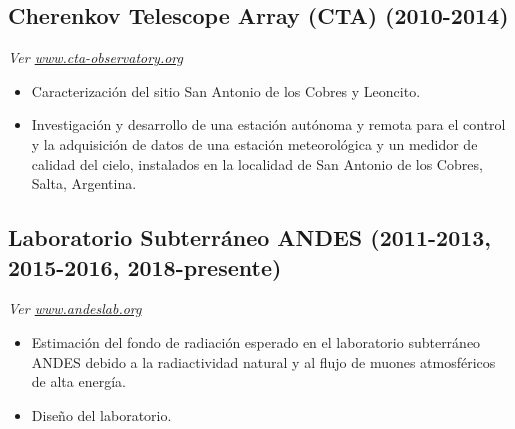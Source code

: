 \subsection*{Cherenkov Telescope Array (CTA) (2010-2014)}
{\small{\textit{Ver \href{http://www.cta-observatory.org}{www.cta-observatory.org}}}}
\begin{itemize}
\item Caracterización del sitio San Antonio de los Cobres y Leoncito. %
\item Investigación y desarrollo de una estación autónoma y remota para el control y la adquisición de datos de una estación meteorológica y un medidor de calidad del cielo, instalados en la localidad de San Antonio de los Cobres, Salta, Argentina.
\end{itemize}
 
\subsection*{Laboratorio Subterráneo ANDES (2011-2013, 2015-2016, 2018-presente)}
{\small{\textit{Ver \href{http://www.andeslab.org}{www.andeslab.org}}}}
\begin{itemize}
\item Estimación del fondo de radiación esperado en el laboratorio subterráneo ANDES debido a la radiactividad natural y al flujo de muones atmosféricos de alta energía.
\item Diseño del laboratorio.
\end{itemize}

